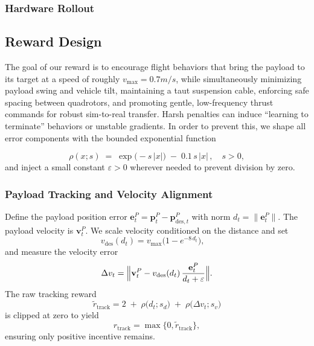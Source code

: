 \subsubsection{Hardware Rollout}




\subsection{Reward Design}
The goal of our reward is to encourage flight behaviors that bring the payload to its target at a speed of roughly $ v_{\max} = 0.7m/s$, while simultaneously minimizing payload swing and vehicle tilt, maintaining a taut suspension cable, enforcing safe spacing between quadrotors, and promoting gentle, low-frequency thrust commands for robust sim-to-real transfer. Harsh penalties can induce “learning to terminate” behaviors or unstable gradients. In order to prevent this, we shape all error components with the bounded exponential function

\begin{equation}
\rho(x; s) \;=\;\exp\bigl(-s\,|x|\bigr)\;-\;0.1\,s\,|x|\,,\quad s>0,
\end{equation}
and inject a small constant \(\varepsilon>0\) wherever needed to prevent division by zero.

\subsubsection{Payload Tracking and Velocity Alignment}
Define the payload position error \(\mathbf{e}^P_t = \mathbf{p}^P_t - \mathbf{p}^P_{\mathrm{des},t}\) with norm \(d_t = \|\mathbf{e}^P_t\|\).  The payload velocity is \(\mathbf{v}^P_t\).  We scale velocity conditioned on the distance and set
\begin{equation}
v_{\mathrm{des}}(d_t)
= v_{\max}\bigl(1 - e^{-8\,d_t}\bigr),\quad
\end{equation}
and measure the velocity error
\begin{equation}
\Delta v_t
= \Bigl\|\mathbf{v}^P_t - v_{\mathrm{des}}(d_t)\,\frac{\mathbf{e}^P_t}{d_t + \varepsilon}\Bigr\|.
\end{equation}
The raw tracking reward
\begin{equation}
\tilde r_{\mathrm{track}}
= 2
\;+\;\rho\bigl(d_t; s_d\bigr)
\;+\;\rho\bigl(\Delta v_t; s_v\bigr)
\end{equation}
is clipped at zero to yield
\begin{equation}
r_{\mathrm{track}}=\max\{0,\tilde r_{\mathrm{track}}\},
\end{equation}
ensuring only positive incentive remains.

